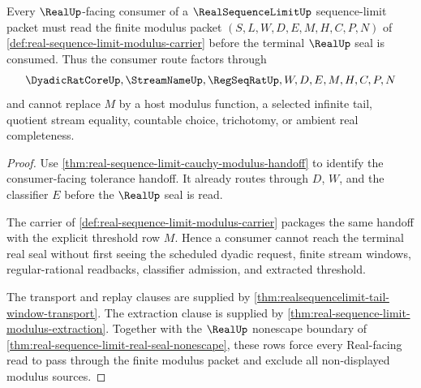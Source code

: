 \begin{theorem}\label{thm:real-sequence-limit-modulus-realup-handoff}
Every $\RealUp$-facing consumer of a $\RealSequenceLimitUp$ sequence-limit packet must read the finite modulus packet $(S,L,W,D,E,M,H,C,P,N)$ of \autoref{def:real-sequence-limit-modulus-carrier} before the terminal $\RealUp$ seal is consumed. Thus the consumer route factors through
$$
\DyadicRatCoreUp,\StreamNameUp,\RegSeqRatUp,W,D,E,M,H,C,P,N
$$
and cannot replace $M$ by a host modulus function, a selected infinite tail, quotient stream equality, countable choice, trichotomy, or ambient real completeness.
\end{theorem}
\begin{proof}
Use \autoref{thm:real-sequence-limit-cauchy-modulus-handoff} to identify the consumer-facing tolerance handoff. It already routes through $D$, $W$, and the classifier $E$ before the $\RealUp$ seal is read.

The carrier of \autoref{def:real-sequence-limit-modulus-carrier} packages the same handoff with the explicit threshold row $M$. Hence a consumer cannot reach the terminal real seal without first seeing the scheduled dyadic request, finite stream windows, regular-rational readbacks, classifier admission, and extracted threshold.

The transport and replay clauses are supplied by \autoref{thm:realsequencelimit-tail-window-transport}. The extraction clause is supplied by \autoref{thm:real-sequence-limit-modulus-extraction}. Together with the $\RealUp$ nonescape boundary of \autoref{thm:real-sequence-limit-real-seal-nonescape}, these rows force every Real-facing read to pass through the finite modulus packet and exclude all non-displayed modulus sources.
\end{proof}

